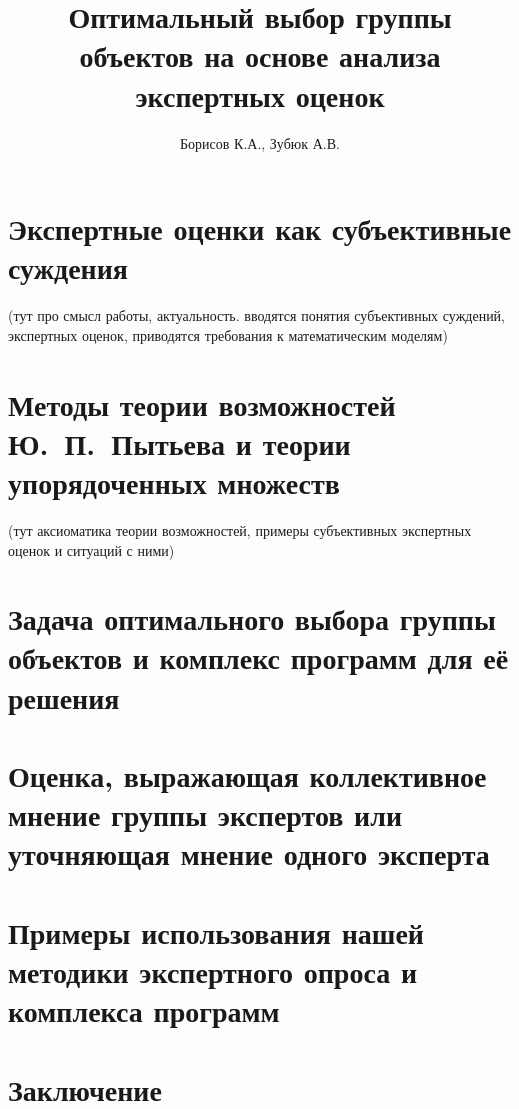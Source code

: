 \documentclass{article}
\begin{document}

\thispagestyle{empty}			

\title{Оптимальный выбор группы объектов на основе анализа экспертных оценок} 
\author{Борисов К.А., Зубюк А.В.}
\maketitle

\tableofcontents
\newpage

\section{Экспертные оценки как субъективные суждения} 
(тут про смысл работы, актуальность. вводятся понятия субъективных суждений, экспертных оценок, приводятся требования к математическим моделям)
% 

\section{Методы теории возможностей Ю.~П.~Пытьева и теории упорядоченных  множеств}
(тут аксиоматика теории возможностей, примеры субъективных экспертных оценок и ситуаций с ними)
% 

\section{Задача оптимального выбора группы объектов и комплекс программ для её решения}


\section{Оценка, выражающая коллективное мнение группы экспертов или уточняющая мнение одного эксперта}
% 

\section{Примеры использования нашей методики экспертного опроса и комплекса программ}


\section{Заключение}
% 

\end{document}
